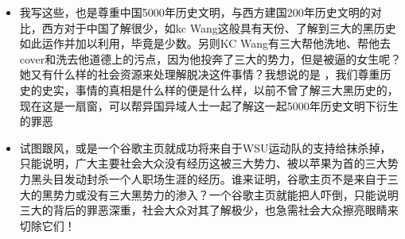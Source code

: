 \documentclass[9pt, b5paper]{article}
\begin{document}
\begin{itemize}
\begin{itemize}
\end{itemize}
\item 我写这些，也是尊重中国5000年历史文明，与西方建国200年历史文明的对比，西方对于中国了解很少，如kc Wang这般具有天份、了解到三大的黑历史如此运作并加以利用，毕竟是少数。另则KC Wang有三大帮他洗地、帮他去cover和洗去他道德上的污点，因为他投奔了三大的势力，但是被逼的女生呢？她又有什么样的社会资源来处理解脱决这件事情？我想说的是 ，我们尊重历史的史实，事情的真相是什么样的便是什么样，以前不曾了解三大黑历史的，现在这是一扇窗，可以帮异国异域人士一起了解这一起5000年历史文明下衍生的罪恶
\item 试图跟风，或是一个谷歌主页就成功将来自于WSU运动队的支持给抹杀掉，只能说明，广大主要社会大众没有经历这被三大势力、被以苹果为首的三大势力黑头目发动封杀一个人职场生涯的经历。谁来证明，谷歌主页不是来自于三大的黑势力或没有三大黑势力的渗入？一个谷歌主页就能把人吓倒，只能说明三大的背后的罪恶深重，社会大众对其了解极少，也急需社会大众擦亮眼睛来切除它们！
\end{itemize}
\end{document}
